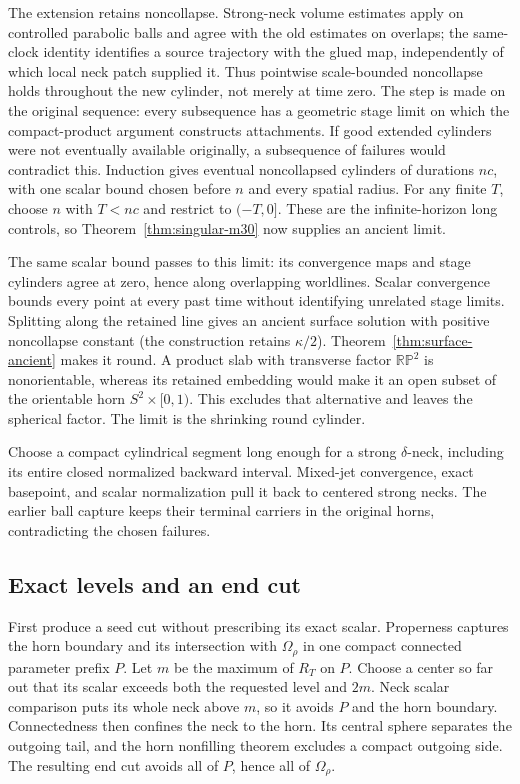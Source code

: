 The extension retains noncollapse. Strong-neck volume estimates apply on
controlled parabolic balls and agree with the old estimates on overlaps; the
same-clock identity identifies a source trajectory with the glued map,
independently of which local neck patch supplied it. Thus pointwise
scale-bounded noncollapse holds throughout the new cylinder, not merely at
time zero. The step is made on the original sequence:
every subsequence has a geometric stage limit on which the compact-product
argument constructs attachments. If good extended cylinders were not
eventually available originally, a subsequence of failures would contradict
this. Induction gives eventual noncollapsed cylinders of durations $nc$,
with one scalar bound chosen before $n$ and every spatial radius.
For any finite $T$, choose $n$ with $T<nc$ and restrict to $(-T,0]$.
These are the infinite-horizon long controls, so
Theorem~\ref{thm:singular-m30} now supplies an ancient limit.

The same scalar bound passes to this limit: its convergence maps and stage
cylinders agree at zero, hence along overlapping worldlines. Scalar
convergence bounds every point at every past time without identifying
unrelated stage limits. Splitting along the retained line gives an ancient
surface solution with positive noncollapse constant (the construction
retains $\kappa/2$). Theorem~\ref{thm:surface-ancient} makes
it round. A product slab with transverse factor $\mathbb{RP}^2$ is
nonorientable, whereas its retained embedding would make it an open subset
of the orientable horn $S^2\times[0,1)$. This excludes that alternative
and leaves the spherical factor. The limit is the shrinking round cylinder.

Choose a compact cylindrical segment long enough for a strong
$\delta$-neck, including its entire closed normalized backward interval.
Mixed-jet convergence, exact basepoint, and scalar normalization pull it
back to centered strong necks. The earlier ball capture keeps their terminal
carriers in the original horns, contradicting the chosen failures.

\subsection{Exact levels and an end cut}

First produce a seed cut without prescribing its exact scalar. Properness
captures the horn boundary and its intersection with $\Omega_\rho$ in
one compact connected parameter prefix $P$. Let $m$ be the maximum of
$R_T$ on $P$. Choose a center so far out that its scalar exceeds both
the requested level and $2m$. Neck scalar comparison puts its whole neck
above $m$, so it avoids $P$ and the horn boundary. Connectedness then
confines the neck to the horn. Its central sphere separates the outgoing
tail, and the horn nonfilling theorem excludes a compact outgoing side.
The resulting end cut avoids all of $P$, hence all of $\Omega_\rho$.


